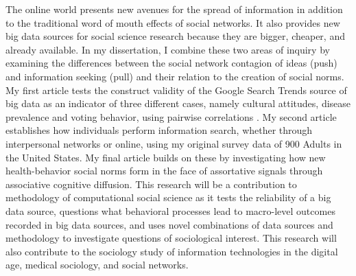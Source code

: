 
The online world presents new avenues for the spread of information in addition to the traditional word of mouth effects of social networks. It also provides new big data sources for social science research because they are bigger, cheaper, and already available. In my dissertation, I combine these two areas of inquiry by examining the differences between the social network contagion of ideas (push) and information seeking (pull) and their relation to the creation of social norms. My first article tests the construct validity of the Google Search Trends source of big data as an indicator of three different cases, namely cultural attitudes, disease prevalence and voting behavior, using pairwise correlations . My second article establishes how individuals perform information search, whether through interpersonal networks or online, using my original survey data of 900 Adults in the United States. My final article builds on these by investigating how new health-behavior social norms form in the face of assortative signals through associative cognitive diffusion. This research will be a contribution to methodology of computational social science as it tests the reliability of a big data source, questions what behavioral processes lead to macro-level outcomes recorded in big data sources, and uses novel combinations of data sources and methodology to investigate questions of sociological interest. This research will also contribute to the sociology study of information technologies in the digital age, medical sociology, and social networks.